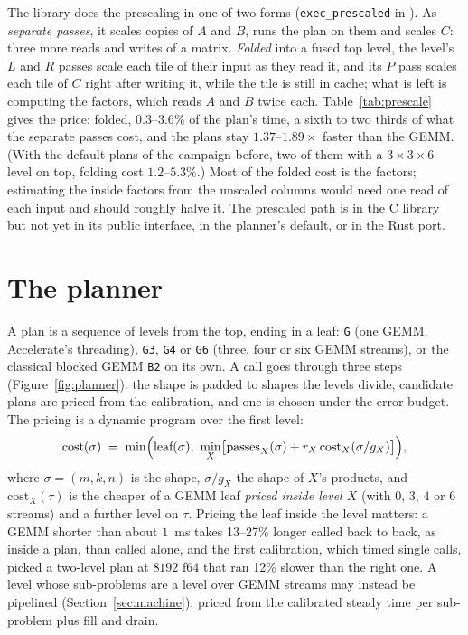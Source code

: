 \documentclass[11pt]{article}
\newcommand{\lv}[1]{\texttt{#1}}
\begin{document}
The library does the prescaling in one of two forms
(\texttt{exec\_prescaled} in ).  As \emph{separate passes},
it scales copies of $A$ and $B$, runs the plan on them and scales $C$: three
more reads and writes of a matrix.  \emph{Folded} into a fused top level, the
level's $L$ and $R$ passes scale each tile of their input as they read it,
and its $P$ pass scales each tile of $C$ right after writing it, while the
tile is still in cache; what is left is computing the factors, which reads
$A$ and $B$ twice each.  Table~\ref{tab:prescale} gives the price: folded,
$0.3$--$3.6\%$ of the plan's time, a sixth to two thirds of what the separate passes cost, and the
plans stay $1.37$--$1.89\times$ faster than the GEMM.  (With the default plans of the campaign before, two of
them with a $3\times3\times6$ level on top, folding cost $1.2$--$5.3\%$.)  Most of the folded
cost is the factors; estimating the inside factors from the unscaled
columns would need one read of each input and should roughly halve it.  The
prescaled path is in the C library but not yet in its public interface, in
the planner's default, or in the Rust port.

\section{The planner}\label{sec:planner}

A plan is a sequence of levels from the top, ending in a leaf: \lv{G} (one
GEMM, Accelerate's threading), \lv{G3}, \lv{G4} or \lv{G6} (three, four or six
GEMM streams), or the classical
blocked GEMM \lv{B2} on its own.  A call goes through three steps
(Figure~\ref{fig:planner}): the shape is padded to shapes the levels divide,
candidate plans are priced from the calibration, and one is chosen under the
error budget.  The pricing is a dynamic program over the
first level:
\begin{equation}\label{eq:dp}
\text{cost}(\sigma) \;=\; \min\Bigl(\text{leaf}(\sigma),\ \min_X\bigl[\text{passes}_X(\sigma)
+ r_X\,\text{cost}_X(\sigma/g_X)\bigr]\Bigr),
\end{equation}
where $\sigma=(m,k,n)$ is the shape, $\sigma/g_X$ the shape of $X$'s products, and $\text{cost}_X(\tau)$ is the cheaper of a GEMM leaf \emph{priced inside level
$X$} (with $0$, $3$, $4$ or $6$ streams) and a further level on $\tau$.  Pricing
the leaf inside the level matters: a GEMM shorter than about $1$~ms takes
13--27\% longer called back to back, as inside a plan, than called alone, and
the first calibration, which timed single calls, picked a two-level plan at
$8192$ f64 that ran 12\% slower than the right one.  A level whose
sub-problems are a level over GEMM streams may instead be pipelined
(Section~\ref{sec:machine}), priced from the calibrated steady time per
sub-problem plus fill and drain.
\end{document}
